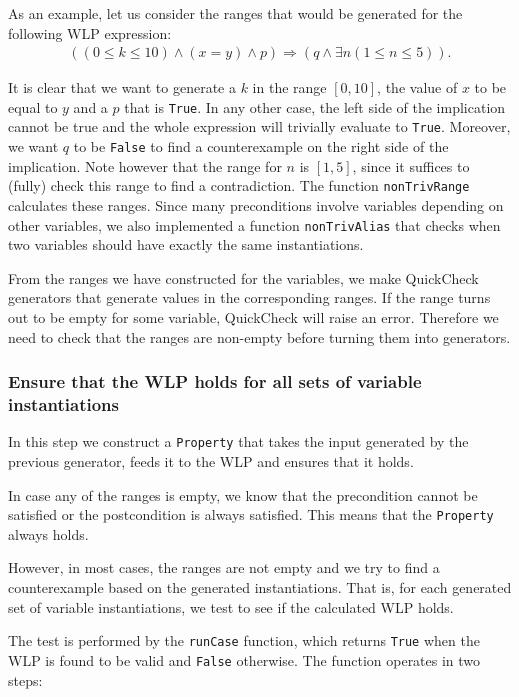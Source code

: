 \documentclass[a4paper]{article}
\begin{document}
As an example, let us consider the ranges that would be generated for the following WLP
expression:
\begin{align*}
	((0 \leq k \leq 10) \wedge (x = y) \wedge p) \Rightarrow (q \wedge \exists n (1 \leq n \leq 5)).
\end{align*}

It is clear that we want to generate a $k$ in the range $[0, 10]$, the value of
$x$ to be equal to $y$ and a $p$ that is \texttt{True}. In any other case, the
left side of the implication cannot be true and the whole expression will
trivially evaluate to \texttt{True}. Moreover, we want $q$ to be \texttt{False}
to find a counterexample on the right side of the implication. Note however that
the range for $n$ is $[1, 5]$, since it suffices to (fully) check this range to
find a contradiction. The function \texttt{nonTrivRange} calculates these
ranges. Since many preconditions involve variables depending on other variables,
we also implemented a function \texttt{nonTrivAlias} that checks when two
variables should have exactly the same instantiations.

From the ranges we have constructed for the variables, we make QuickCheck
generators that generate values in the corresponding ranges. If the range turns
out to be empty for some variable, QuickCheck will raise an error. Therefore
we need to check that the ranges are non-empty before turning them into generators.

\subsubsection*{Ensure that the WLP holds for all sets of variable instantiations}

In this step we construct a \texttt{Property} that takes the input generated by
the previous generator, feeds it to the WLP and ensures that it holds.

In case any of the ranges is empty, we know that the precondition cannot be
satisfied or the postcondition is always satisfied. This means that the
\texttt{Property} always holds.

However, in most cases, the ranges are not empty and we try to find a counterexample
based on the generated instantiations. That is, for each generated set of variable
instantiations, we test to see if the calculated WLP holds.

The test is performed by the \texttt{runCase} function, which returns \texttt{True}
when the WLP is found to be valid and \texttt{False} otherwise. The function
operates in two steps:
\end{document}
